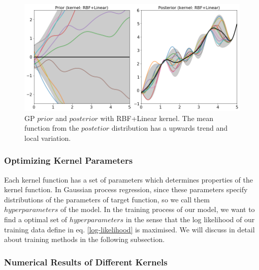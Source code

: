 \documentclass[11pt,a4paper]{article}
\theoremstyle{definition}
\numberwithin{equation}{section}
\begin{document}
	\begin{figure}[h!]
		\centering
		\includegraphics[width=.9\linewidth]{kernel_combo.png}
		\caption{GP $prior$ and $posterior$ with RBF+Linear kernel. The mean function from the $postetior$ distribution has a upwards trend and local variation.}
		\label{fig:gp_kernel_combo}
	\end{figure}
	
	\subsubsection{Optimizing Kernel Parameters}
	Each kernel function has a set of parameters which determines properties of the kernel function. In Gaussian process regression, since these parameters specify distributions of the parameters of target function, so we call them $hyperparameters$ of the model. In the training process of our model, we want to find a optimal set of $hyperparameters$ in the sense that the log likelihood of our training data define in eq. \ref{log-likelihood} is maximised. We will discuss in detail about training methods in the following subsection.
	
	\subsubsection{Numerical Results of Different Kernels}
	
\end{document}
